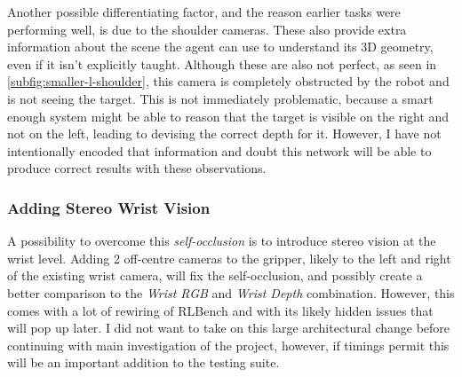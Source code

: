 Another possible differentiating factor, and the reason earlier tasks were performing well, is due to the shoulder cameras. These also provide extra information about the scene the agent can use to understand its 3D geometry, even if it isn't explicitly taught. Although these are also not perfect, as seen in \ref{subfig:smaller-l-shoulder}, this camera is completely obstructed by the robot and is not seeing the target. This is not immediately problematic, because a smart enough system might be able to reason that the target is visible on the right and not on the left, leading to devising the correct depth for it. However, I have not intentionally encoded that information and doubt this network will be able to produce correct results with these observations.

\subsubsection{Adding Stereo Wrist Vision}
A possibility to overcome this \emph{self-occlusion} is to introduce stereo vision at the wrist level. Adding 2 off-centre cameras to the gripper, likely to the left and right of the existing wrist camera, will fix the self-occlusion, and possibly create a better comparison to the \emph{Wrist RGB} and \emph{Wrist Depth} combination. However, this comes with a lot of rewiring of RLBench and with its likely hidden issues that will pop up later. I did not want to take on this large architectural change before continuing with main investigation of the project, however, if timings permit this will be an important addition to the testing suite.
